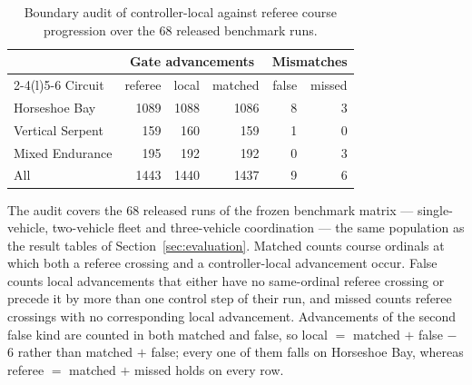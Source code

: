 \begin{table}[t]
\centering
\caption{Boundary audit of controller-local against referee course progression over the $68$ released benchmark runs.}
\label{tab:local_vs_referee}
\mratablestyle
\begin{tabular}{@{}lrrrrr@{}}
\toprule
 & \multicolumn{3}{c}{Gate advancements} & \multicolumn{2}{c}{Mismatches} \\
\cmidrule(lr){2-4}\cmidrule(l){5-6}
Circuit & referee & local & matched & false & missed \\
\midrule
Horseshoe Bay    & 1089 & 1088 & 1086 & 8 & 3 \\
Vertical Serpent &  159 &  160 &  159 & 1 & 0 \\
Mixed Endurance  &  195 &  192 &  192 & 0 & 3 \\
\midrule
All              & 1443 & 1440 & 1437 & 9 & 6 \\
\bottomrule
\end{tabular}
\mratablenote
The audit covers the 68 released runs of the frozen benchmark matrix ---
single-vehicle, two-vehicle fleet and three-vehicle coordination --- the same
population as the result tables of Section~\ref{sec:evaluation}.
Matched counts course ordinals at which both a referee crossing and a
controller-local advancement occur. False counts local advancements that either
have no same-ordinal referee crossing or precede it by more than one control step
of their run, and missed counts referee crossings with no corresponding local
advancement. Advancements of the second false kind are counted in both matched
and false, so local $=$ matched $+$ false $-$ 6 rather than matched $+$ false;
every one of them falls on Horseshoe Bay, whereas referee $=$ matched $+$ missed
holds on every row.
\end{table}
